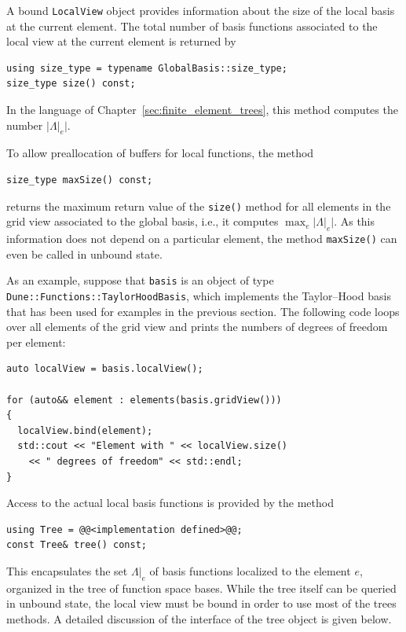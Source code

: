 \documentclass[a4paper,10pt,headings=normal,bibliography=totoc]{scrartcl}
\newcommand{\cpp}[1]{\lstinline[basicstyle=\ttfamily]!#1!}
\newcommand{\abs}[1]{{\lvert#1\rvert}}
\begin{document}
A bound \cpp{LocalView} object provides information
about the size of the local basis at the current element.
The total number of basis functions associated to the
local view at the current element is returned by
\begin{lstlisting}[style=Interface]
using size_type = typename GlobalBasis::size_type;
size_type size() const;
\end{lstlisting}
In the language of Chapter~\ref{sec:finite_element_trees}, this method computes
the number $\abs{\Lambda|_e}$.

To allow preallocation of buffers for local functions, the method
\begin{lstlisting}[style=Interface]
size_type maxSize() const;
\end{lstlisting}
returns the maximum return value of the
\cpp{size()} method for all elements in the grid view
associated to the global basis, i.e., it computes $\max_e \abs{\Lambda|_e}$.
As this information does not depend on a particular element,
the method \cpp{maxSize()} can even be called in unbound state.

As an example, suppose that \cpp{basis} is an object of type \cpp{Dune::Functions::TaylorHoodBasis},
which implements the Taylor--Hood basis that has been used for examples in the previous section.
The following code loops over all elements of the grid view and prints the numbers
of degrees of freedom per element:
\begin{lstlisting}[style=example]
auto localView = basis.localView();

for (auto&& element : elements(basis.gridView()))
{
  localView.bind(element);
  std::cout << "Element with " << localView.size()
    << " degrees of freedom" << std::endl;
}
\end{lstlisting}


Access to the actual local basis functions is provided
by the method
\begin{lstlisting}[style=Interface]
using Tree = @@<implementation defined>@@;
const Tree& tree() const;
\end{lstlisting}
This encapsulates the set $\Lambda|_e$ of basis functions localized to the
element $e$, organized in the tree of function space bases.
While the tree  itself can be queried in unbound state,
the local view must be bound in order to use most of the
trees methods.
A detailed discussion of the interface of the tree object is
given below.
\end{document}
